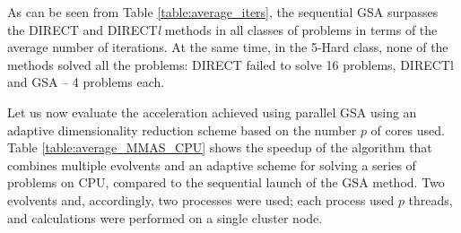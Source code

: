 \documentclass{svproc}
\begin{document}
As can be seen from Table \ref{table:average_iters}, the sequential GSA surpasses the DIRECT and DIRECT\textit{l} methods in all classes of problems in terms of the average number of iterations. At the same time, in the 5-Hard class, none of the methods solved all the problems: DIRECT failed to solve 16 problems, DIRECTl and GSA -- 4 problems each.




Let us now evaluate the acceleration achieved using parallel GSA using an adaptive dimensionality reduction scheme based on the number $p$ of cores used.
Table \ref{table:average_MMAS_CPU} shows the speedup of the algorithm that combines multiple evolvents and an adaptive scheme for solving a series of problems on CPU, compared to the sequential launch of the GSA method. Two evolvents and, accordingly, two processes were used; each process used $p$ threads, and calculations were performed on a single cluster node.
   
\end{document}
